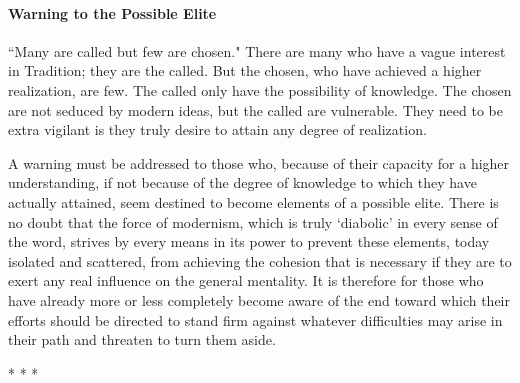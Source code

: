 \paragraph{Warning to the Possible Elite}
``Many are called but few are chosen." There are many who have a vague interest in Tradition; they are the called. But the chosen, who have achieved a higher realization, are few. The called only have the possibility of knowledge. The chosen are not seduced by modern ideas, but the called are vulnerable. They need to be extra vigilant is they truly desire to attain any degree of realization.

\begin{quotex}
A warning must be addressed to those who, because of their capacity for a higher understanding, if not because of the degree of knowledge to which they have actually attained, seem destined to become elements of a possible elite. There is no doubt that the force of modernism, which is truly `diabolic' in every sense of the word, strives by every means in its power to prevent these elements, today isolated and scattered, from achieving the cohesion that is necessary if they are to exert any real influence on the general mentality. It is therefore for those who have already more or less completely become aware of the end toward which their efforts should be directed to stand firm against whatever difficulties may arise in their path and threaten to turn them aside.

\end{quotex}



\begin{center}* * *\end{center}

